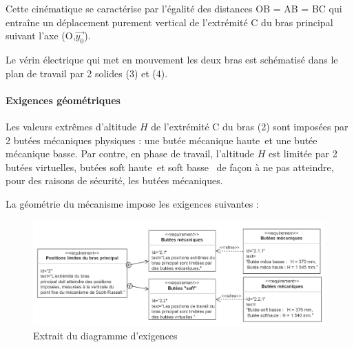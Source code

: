Cette cinématique se caractérise par l'égalité des distances OB = AB = BC qui entraîne un déplacement purement vertical de l'extrémité C du bras principal suivant l'axe (O,$\vec{y_0}$).

Le vérin électrique qui met en mouvement les deux bras est schématisé dans le plan de travail par 2 solides (3) et (4).

\paragraph{Exigences géométriques}

Les valeurs extrêmes d'altitude $H$ de l'extrémité C du bras (2) sont imposées par 2 butées mécaniques physiques : une butée \og mécanique haute\fg\ et une butée \og mécanique basse\fg. Par contre, en phase de travail, l'altitude $H$ est limitée par 2 butées virtuelles, butées \og soft haute\fg\ et \og soft basse \fg\ de façon à ne pas atteindre, pour des raisons de sécurité, les butées mécaniques.

La géométrie du mécanisme impose les exigences suivantes :
\begin{figure}[ht!]
\begin{center}
 \includegraphics[width=0.9\linewidth]{img/fig08}
\end{center}
\caption{\label{fig08} Extrait du diagramme d'exigences}
\end{figure}

\vspace{-0.5cm}





